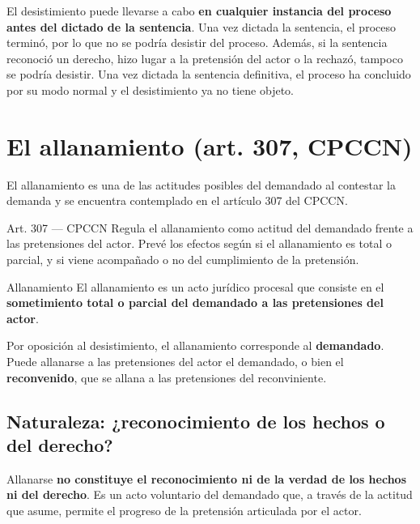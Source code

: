 \documentclass[12pt,oneside]{book}
\begin{document}
El desistimiento puede llevarse a cabo \textbf{en cualquier instancia del proceso antes del dictado de la sentencia}. Una vez dictada la sentencia, el proceso terminó, por lo que no se podría desistir del proceso. Además, si la sentencia reconoció un derecho, hizo lugar a la pretensión del actor o la rechazó, tampoco se podría desistir. Una vez dictada la sentencia definitiva, el proceso ha concluido por su modo normal y el desistimiento ya no tiene objeto.

\section{El allanamiento (art. 307, CPCCN)}

El allanamiento es una de las actitudes posibles del demandado al contestar la demanda y se encuentra contemplado en el artículo 307 del CPCCN.

\begin{articulo}{Art. 307 --- CPCCN}
Regula el allanamiento como actitud del demandado frente a las pretensiones del actor. Prevé los efectos según si el allanamiento es total o parcial, y si viene acompañado o no del cumplimiento de la pretensión.
\end{articulo}

\begin{definition}{Allanamiento}
El allanamiento es un acto jurídico procesal que consiste en el \textbf{sometimiento total o parcial del demandado a las pretensiones del actor}.
\end{definition}

Por oposición al desistimiento, el allanamiento corresponde al \textbf{demandado}. Puede allanarse a las pretensiones del actor el demandado, o bien el \textbf{reconvenido}, que se allana a las pretensiones del reconviniente.

\subsection{Naturaleza: ¿reconocimiento de los hechos o del derecho?}

\begin{important}
Allanarse \textbf{no constituye el reconocimiento ni de la verdad de los hechos ni del derecho}. Es un acto voluntario del demandado que, a través de la actitud que asume, permite el progreso de la pretensión articulada por el actor.
\end{important}
\end{document}
